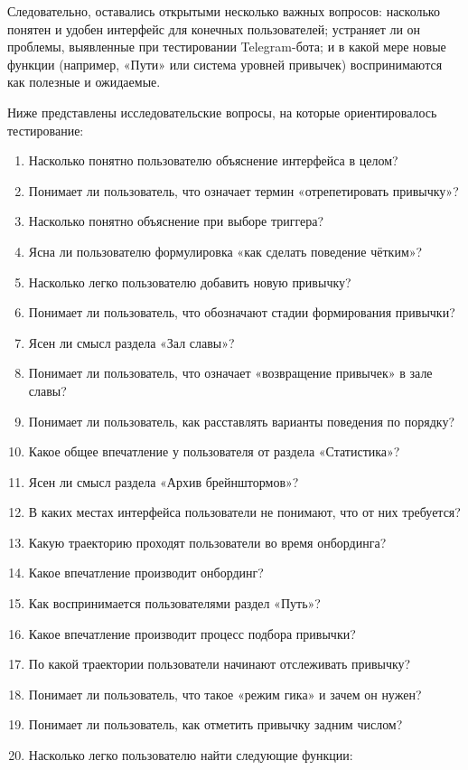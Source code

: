 \documentclass[pdflatex,sn-mathphys-num]{sn-jnl}%
\theoremstyle{thmstyleone}%
\theoremstyle{thmstyletwo}%
\theoremstyle{thmstylethree}%
\begin{document}
Следовательно, оставались открытыми несколько важных вопросов: насколько понятен и удобен интерфейс для конечных пользователей; устраняет ли он проблемы, выявленные при тестировании Telegram-бота; и в какой мере новые функции (например, «Пути» или система уровней привычек) воспринимаются как полезные и ожидаемые.

Ниже представлены исследовательские вопросы, на которые ориентировалось тестирование:

\begin{enumerate}
  \item Насколько понятно пользователю объяснение интерфейса в целом?
  \item Понимает ли пользователь, что означает термин «отрепетировать привычку»?
  \item Насколько понятно объяснение при выборе триггера?
  \item Ясна ли пользователю формулировка «как сделать поведение чётким»?
  \item Насколько легко пользователю добавить новую привычку?
  \item Понимает ли пользователь, что обозначают стадии формирования привычки?
  \item Ясен ли смысл раздела «Зал славы»?
  \item Понимает ли пользователь, что означает «возвращение привычек» в зале славы?
  \item Понимает ли пользователь, как расставлять варианты поведения по порядку?
  \item Какое общее впечатление у пользователя от раздела «Статистика»?
  \item Ясен ли смысл раздела «Архив брейнштормов»?
  \item В каких местах интерфейса пользователи не понимают, что от них требуется?
  \item Какую траекторию проходят пользователи во время онбординга?
  \item Какое впечатление производит онбординг?
  \item Как воспринимается пользователями раздел «Путь»?
  \item Какое впечатление производит процесс подбора привычки?
  \item По какой траектории пользователи начинают отслеживать привычку?
  \item Понимает ли пользователь, что такое «режим гика» и зачем он нужен?
  \item Понимает ли пользователь, как отметить привычку задним числом?
  \item Насколько легко пользователю найти следующие функции:

\end{enumerate}
\end{document}
